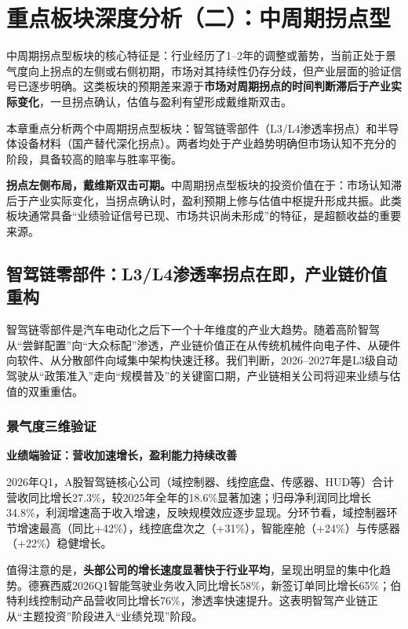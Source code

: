 
\chapter{重点板块深度分析（二）：中周期拐点型}

中周期拐点型板块的核心特征是：行业经历了1--2年的调整或蓄势，当前正处于景气度向上拐点的左侧或右侧初期，市场对其持续性仍存分歧，但产业层面的验证信号已逐步明确。这类板块的预期差来源于\textbf{市场对周期拐点的时间判断滞后于产业实际变化}，一旦拐点确认，估值与盈利有望形成戴维斯双击。

本章重点分析两个中周期拐点型板块：智驾链零部件（L3/L4渗透率拐点）和半导体设备材料（国产替代深化拐点）。两者均处于产业趋势明确但市场认知不充分的阶段，具备较高的赔率与胜率平衡。

\begin{keyinsight}[中周期拐点型板块核心特征]
\textbf{拐点左侧布局，戴维斯双击可期。}中周期拐点型板块的投资价值在于：市场认知滞后于产业实际变化，当拐点确认时，盈利预期上修与估值中枢提升形成共振。此类板块通常具备“业绩验证信号已现、市场共识尚未形成”的特征，是超额收益的重要来源。
\end{keyinsight}

\section{智驾链零部件：L3/L4渗透率拐点在即，产业链价值重构}

智驾链零部件是汽车电动化之后下一个十年维度的产业大趋势。随着高阶智驾从“尝鲜配置”向“大众标配”渗透，产业链价值正在从传统机械件向电子件、从硬件向软件、从分散部件向域集中架构快速迁移。我们判断，2026--2027年是L3级自动驾驶从“政策准入”走向“规模普及”的关键窗口期，产业链相关公司将迎来业绩与估值的双重重估。

\subsection{景气度三维验证}

\textbf{业绩端验证：营收加速增长，盈利能力持续改善}

2026年Q1，A股智驾链核心公司（域控制器、线控底盘、传感器、HUD等）合计营收同比增长27.3\%，较2025年全年的18.6\%显著加速；归母净利润同比增长34.8\%，利润增速高于收入增速，反映规模效应逐步显现。分环节看，域控制器环节增速最高（同比+42\%），线控底盘次之（+31\%），智能座舱（+24\%）与传感器（+22\%）稳健增长。

值得注意的是，\textbf{头部公司的增长速度显著快于行业平均}，呈现出明显的集中化趋势。德赛西威2026Q1智能驾驶业务收入同比增长58\%，新签订单同比增长65\%；伯特利线控制动产品营收同比增长76\%，渗透率快速提升。这表明智驾产业链正从“主题投资”阶段进入“业绩兑现”阶段。

